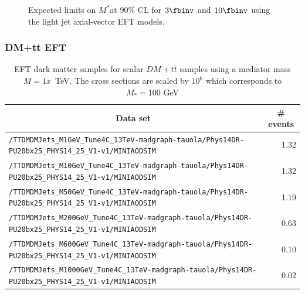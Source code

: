 \begin{figure}[h]
  \centering
  \caption{\label{fig:MJ_EFT_limit} Expected limits on $M^*$at 90\% CL for $3\fbinv$ and $10\fbinv$ using the light jet axial-vector EFT models. }
\end{figure}



\subsubsection{DM+tt EFT}

\begin{table}
    \centering
    \caption{EFT dark matter samples for scalar $DM+t\bar{t}$ samples using a mediator mass $M=1x$~TeV. The cross sections are scaled by $10^6$ which corresponds to $M_*=100$ GeV \label{tab:datasets_dm}}
    \begin{tabular}{lr}
      \hline\hline
      \multicolumn{1}{c}{Data set}&\multicolumn{1}{c}{\# events}\tabularnewline
      \hline
      {\footnotesize \verb!/TTDMDMJets_M1GeV_Tune4C_13TeV-madgraph-tauola/Phys14DR- PU20bx25_PHYS14_25_V1-v1/MINIAODSIM!}   & 1.32 \tabularnewline
      {\footnotesize \verb!/TTDMDMJets_M10GeV_Tune4C_13TeV-madgraph-tauola/Phys14DR- PU20bx25_PHYS14_25_V1-v1/MINIAODSIM!}  & 1.32 \tabularnewline
      {\footnotesize \verb!/TTDMDMJets_M50GeV_Tune4C_13TeV-madgraph-tauola/Phys14DR- PU20bx25_PHYS14_25_V1-v1/MINIAODSIM!}  & 1.19 \tabularnewline
      {\footnotesize \verb!/TTDMDMJets_M200GeV_Tune4C_13TeV-madgraph-tauola/Phys14DR- PU20bx25_PHYS14_25_V1-v1/MINIAODSIM!} & 0.63 \tabularnewline
      {\footnotesize \verb!/TTDMDMJets_M600GeV_Tune4C_13TeV-madgraph-tauola/Phys14DR- PU20bx25_PHYS14_25_V1-v1/MINIAODSIM!} & 0.10 \tabularnewline
      {\footnotesize \verb!/TTDMDMJets_M1000GeV_Tune4C_13TeV-madgraph-tauola/Phys14DR- PU20bx25_PHYS14_25_V1-v1/MINIAODSIM!}& 0.02 \tabularnewline
      \hline \hline
\end{tabular}
\end{table}

